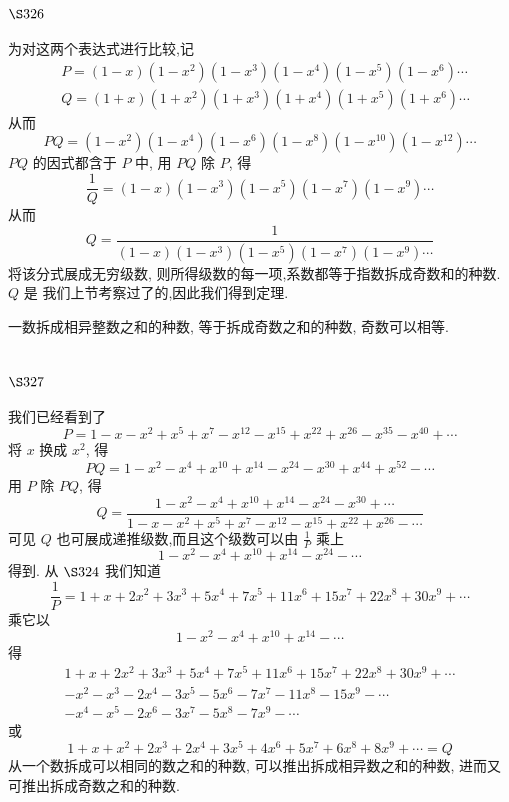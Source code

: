 \section{$\S 326$}

为对这两个表达式进行比较,记
\[
\begin{aligned}
& P=(1-x)\left(1-x^{2}\right)\left(1-x^{3}\right)\left(1-x^{4}\right)\left(1-x^{5}\right)\left(1-x^{6}\right) \cdots \\
& Q=(1+x)\left(1+x^{2}\right)\left(1+x^{3}\right)\left(1+x^{4}\right)\left(1+x^{5}\right)\left(1+x^{6}\right) \cdots
\end{aligned}
\]
从而
\[
P Q=\left(1-x^{2}\right)\left(1-x^{4}\right)\left(1-x^{6}\right)\left(1-x^{8}\right)\left(1-x^{10}\right)\left(1-x^{12}\right) \cdots
\]
$P Q$ 的因式都含于 $P$ 中, 用 $P Q$ 除 $P$, 得 
\[
\frac{1}{Q}=(1-x)\left(1-x^{3}\right)\left(1-x^{5}\right)\left(1-x^{7}\right)\left(1-x^{9}\right) \cdots
\]
从而
\[
Q=\frac{1}{(1-x)\left(1-x^{3}\right)\left(1-x^{5}\right)\left(1-x^{7}\right)\left(1-x^{9}\right) \cdots}
\]
将该分式展成无穷级数, 则所得级数的每一项,系数都等于指数拆成奇数和的种数. $Q$ 是 我们上节考察过了的,因此我们得到定理.

一数拆成相异整数之和的种数, 等于拆成奇数之和的种数, 奇数可以相等.

\section{$\S 327$}

我们已经看到了
\[
P=1-x-x^{2}+x^{5}+x^{7}-x^{12}-x^{15}+x^{22}+x^{26}-x^{35}-x^{40}+\cdots
\]
将 $x$ 换成 $x^{2}$, 得
\[
P Q=1-x^{2}-x^{4}+x^{10}+x^{14}-x^{24}-x^{30}+x^{44}+x^{52}-\cdots
\]
用 $P$ 除 $P Q$, 得
\[
Q=\frac{1-x^{2}-x^{4}+x^{10}+x^{14}-x^{24}-x^{30}+\cdots}{1-x-x^{2}+x^{5}+x^{7}-x^{12}-x^{15}+x^{22}+x^{26}-\cdots}
\]
可见 $Q$ 也可展成递推级数,而且这个级数可以由 $\frac{1}{P}$ 乘上
\[
1-x^{2}-x^{4}+x^{10}+x^{14}-x^{24}-\cdots
\]
得到. 从 $\S 324$ 我们知道
\[
\frac{1}{P}=1+x+2 x^{2}+3 x^{3}+5 x^{4}+7 x^{5}+11 x^{6}+15 x^{7}+22 x^{8}+30 x^{9}+\cdots
\]
乘它以
\[
1-x^{2}-x^{4}+x^{10}+x^{14}-\cdots
\]
得
\[
\begin{gathered}
1+x+2 x^{2}+3 x^{3}+5 x^{4}+7 x^{5}+11 x^{6}+15 x^{7}+22 x^{8}+30 x^{9}+\cdots \\
-x^{2}-x^{3}-2 x^{4}-3 x^{5}-5 x^{6}-7 x^{7}-11 x^{8}-15 x^{9}-\cdots \\
-x^{4}-x^{5}-2 x^{6}-3 x^{7}-5 x^{8}-7 x^{9}-\cdots
\end{gathered}
\]
或
\[
1+x+x^{2}+2 x^{3}+2 x^{4}+3 x^{5}+4 x^{6}+5 x^{7}+6 x^{8}+8 x^{9}+\cdots=Q
\]
从一个数拆成可以相同的数之和的种数, 可以推出拆成相异数之和的种数, 进而又 可推出拆成奇数之和的种数.

